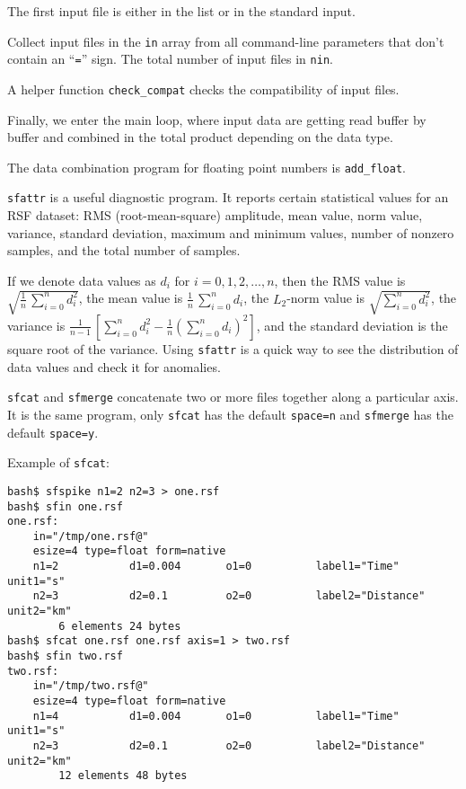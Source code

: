 The first input file is either in the list or in the standard input.

Collect input files in the \texttt{in} array from all command-line
parameters that don't contain an ``\texttt{=}'' sign. The total number
of input files in \texttt{nin}.

A helper function \texttt{check\_compat} checks the compatibility of
input files.

Finally, we enter the main loop, where input data are getting read
buffer by buffer and combined in the total product depending on the
data type.

The data combination program for floating point numbers is
\texttt{add\_float}.  

\noindent\doublebox{\parbox{\textwidth}{

}}

\texttt{sfattr} is a useful diagnostic program. It reports certain
statistical values for an RSF dataset: RMS (root-mean-square)
amplitude, mean value, norm value, variance, standard deviation,
maximum and minimum values, number of nonzero samples, and the total
number of samples.

If we denote data values as $d_i$ for $i=0,1,2,\ldots,n$, then the RMS
value is $\sqrt{\frac{1}{n}\,\sum\limits_{i=0}^n d_i^2}$, the mean
value is $\frac{1}{n}\,\sum\limits_{i=0}^n d_i$, the $L_2$-norm value
is $\sqrt{\sum\limits_{i=0}^n d_i^2}$, the variance is
$\frac{1}{n-1}\,\left[\sum\limits_{i=0}^n d_i^2 - \frac{1}{n}\left(\sum\limits_{i=0}^n d_i\right)^2\right]$, and the standard
deviation is the square root of the variance. Using \texttt{sfattr}
is a quick way to see the distribution of data values and check it for
anomalies.

\noindent\doublebox{\parbox{\textwidth}{

}}

\texttt{sfcat} and \texttt{sfmerge} concatenate two or more files
together along a particular axis. It is the same program, only
\texttt{sfcat} has the default \texttt{space=n} and \texttt{sfmerge}
has the default \texttt{space=y}.

Example of \texttt{sfcat}:
\begin{verbatim}
bash$ sfspike n1=2 n2=3 > one.rsf
bash$ sfin one.rsf
one.rsf:
    in="/tmp/one.rsf@"
    esize=4 type=float form=native
    n1=2           d1=0.004       o1=0          label1="Time" unit1="s"
    n2=3           d2=0.1         o2=0          label2="Distance" unit2="km"
        6 elements 24 bytes
bash$ sfcat one.rsf one.rsf axis=1 > two.rsf
bash$ sfin two.rsf
two.rsf:
    in="/tmp/two.rsf@"
    esize=4 type=float form=native
    n1=4           d1=0.004       o1=0          label1="Time" unit1="s"
    n2=3           d2=0.1         o2=0          label2="Distance" unit2="km"
        12 elements 48 bytes
\end{verbatim}

